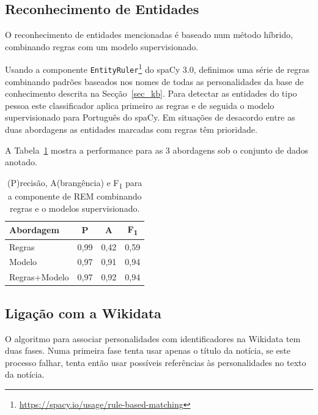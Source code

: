 \documentclass[a4paper, twocolumn, 11pt, twoside]{article}
\begin{document}
\subsection{Reconhecimento de Entidades}
\label{subsec:ner}


O reconhecimento de entidades mencionadas é baseado num método híbrido, combinando regras com um modelo supervisionado.

Usando a componente \texttt{EntityRuler}\footnote{\url{https://spacy.io/usage/rule-based-matching}} do spaCy 3.0, definimos uma série de regras combinando padrões baseados nos nomes de todas as personalidades da base de conhecimento descrita na Secção~\ref{sec_kb}. Para detectar as entidades do tipo pessoa este classificador aplica primeiro as regras e de seguida o modelo supervisionado para Português do spaCy. Em situações de desacordo entre as duas abordagens as entidades marcadas com regras têm prioridade.

A Tabela~\ref{tab:results_ner} mostra a performance para as 3 abordagens sob o conjunto de dados anotado.


\begin{table}[!h]
    \begin{center}
    \begin{tabular}{l ccc}
		{\bf Abordagem}  & {\bf P} & {\bf A} & {\bf F\textsubscript{1}} \\
        \hline
        Regras           &  0,99     &  0,42     & 		0,59		\\
        Modelo           &  0,97     &  0,91     & 		0,94		\\
		Regras+Modelo    &  0,97     &  0,92     & 		0,94		\\
    \end{tabular}
	\caption{ (P)recisão, A(brangência) e F\textsubscript{1} para a componente de REM combinando regras e o modelos supervisionado.}	
	\label{tab:results_ner}
	\end{center}
\end{table}

\subsection{Ligação com a Wikidata}
\label{subsec:ent_linking}

O algoritmo para associar personalidades com identificadores na Wikidata tem duas fases. Numa primeira fase tenta usar apenas o título da notícia, se este processo falhar, tenta então usar possíveis referências às personalidades no texto da notícia.
\end{document}
